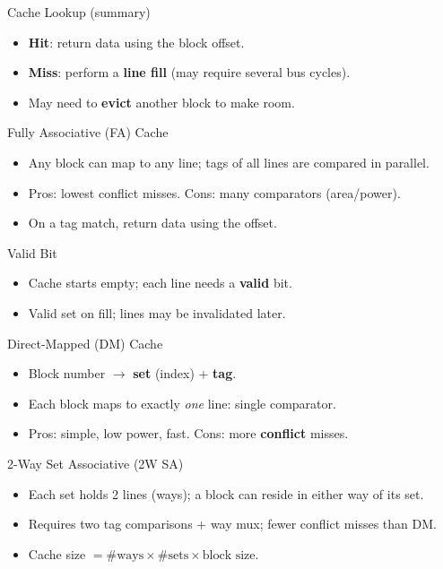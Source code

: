 \documentclass[aspectratio=169,12pt]{beamer}
\begin{document}
\begin{frame}{Cache Lookup (summary)}
\begin{itemize}
  \item \textbf{Hit}: return data using the block offset.
  \item \textbf{Miss}: perform a \textbf{line fill} (may require several bus cycles).
  \item May need to \textbf{evict} another block to make room.
\end{itemize}
\end{frame}

\begin{frame}{Fully Associative (FA) Cache}
\begin{itemize}
  \item Any block can map to any line; tags of all lines are compared in parallel.
  \item Pros: lowest conflict misses. Cons: many comparators (area/power).
  \item On a tag match, return data using the offset.
\end{itemize}
\end{frame}

\begin{frame}{Valid Bit}
\begin{itemize}
  \item Cache starts empty; each line needs a \textbf{valid} bit.
  \item Valid set on fill; lines may be invalidated later.
\end{itemize}
\end{frame}

\begin{frame}{Direct-Mapped (DM) Cache}
\begin{itemize}
  \item Block number $\rightarrow$ \textbf{set} (index) + \textbf{tag}.
  \item Each block maps to exactly \emph{one} line: single comparator.
  \item Pros: simple, low power, fast. Cons: more \textbf{conflict} misses.
\end{itemize}
\end{frame}

\begin{frame}{2-Way Set Associative (2W SA)}
\begin{itemize}
  \item Each set holds 2 lines (ways); a block can reside in either way of its set.
  \item Requires two tag comparisons + way mux; fewer conflict misses than DM.
  \item Cache size $=\#\text{ways}\times\#\text{sets}\times\text{block size}$.
\end{itemize}
\end{frame}
\end{document}

